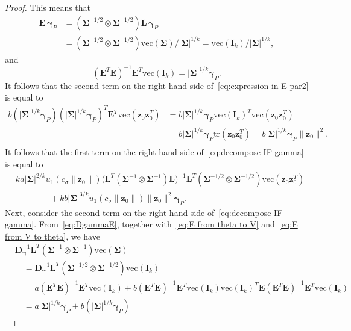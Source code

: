 \documentclass{article}
\numberwithin{equation}{section}
\theoremstyle{plain}
\newcommand{\vc}{\mathrm{vec}}
\newcommand{\bgamma}{\bm\gamma}
\newcommand{\bSigma}{\mathbf{\Sigma}}
\newcommand{\bz}{\mathbf{z}}
\newcommand{\bI}{\mathbf{I}}
\newcommand{\bD}{\mathbf{D}}
\newcommand{\bL}{\mathbf{L}}
\newcommand{\bE}{\mathbf{E}}
\begin{document}
\begin{proof}
This means that
\begin{equation}
\label{eq:E from theta to V}
\begin{split}
\bE\,\bgamma_P
&=
\left(\bSigma^{-1/2}\otimes\bSigma^{-1/2}\right)\bL\,
\bgamma_P\\
&=
\left(\bSigma^{-1/2}\otimes\bSigma^{-1/2}\right)
\vc(\bSigma)/|\bSigma|^{1/k}
=
\vc(\bI_k)/|\bSigma|^{1/k},
\end{split}
\end{equation}
and
\begin{equation}
\label{eq:E from V to theta}
(\bE^T\bE)^{-1}\bE^T\vc(\bI_k)=|\bSigma|^{1/k}\bgamma_P.
\end{equation} 
It follows that the second term on the right hand side of~\eqref{eq:expression in E par2} is equal to
\[
\begin{split}
b
\left(|\bSigma|^{1/k}\bgamma_P\right)
\left(|\bSigma|^{1/k}\bgamma_P\right)^T
\bE^T\vc\left(\bz_0\bz_0^T\right)
&=
b|\bSigma|^{1/k}
\bgamma_P
\vc(\bI_k)^T\vc\left(\bz_0\bz_0^T\right)\\
&=
b|\bSigma|^{1/k}
\bgamma_P
\text{tr}\left(\bz_0\bz_0^T\right)
=
b|\bSigma|^{1/k}
\bgamma_P
\|\bz_0\|^2.\\
\end{split}
\]
It follows that the first term on the right hand side of~\eqref{eq:decompose IF gamma} is equal to
\[
\begin{split}
&
ka
|\bSigma|^{2/k}
u_1\left(c_\sigma\|\bz_0\|\right)
\Big(\bL^T(\bSigma^{-1}\otimes\bSigma^{-1})\bL\Big)^{-1}
\bL^T\left(\bSigma^{-1/2}\otimes\bSigma^{-1/2}\right)
\vc\left(\bz_0\bz_0^T\right)\\
&\qquad\qquad+
kb
|\bSigma|^{3/k}
u_1\left(c_\sigma\|\bz_0\|\right)
\|\bz_0\|^2\bgamma_P.
\end{split}
\]
Next, consider the second term on the right hand side of~\eqref{eq:decompose IF gamma}.
From~\eqref{eq:DgammaE},
together with~\eqref{eq:E from theta to V} and~\eqref{eq:E from V to theta},
we have 
\[
\begin{split}
&
\bD_{\bgamma}^{-1}
\bL^T
(\bSigma^{-1}\otimes\bSigma^{-1})
\vc(\bSigma)\\
&\quad=
\bD_{\bgamma}^{-1}
\bL^T
(\bSigma^{-1/2}\otimes\bSigma^{-1/2})
\vc(\bI_k)\\
&\quad=
a(\bE^T\bE)^{-1}
\bE^T
\vc\left(\bI_k\right)
+
b
(\bE^T\bE)^{-1}
\bE^T\vc(\bI_k)
\vc(\bI_k)^T\bE
(\bE^T\bE)^{-1}
\bE^T
\vc\left(\bI_k\right)\\
&\quad=
a|\bSigma|^{1/k}\bgamma_P
+
b(|\bSigma|^{1/k}\bgamma_P)

\end{split}\]
\end{proof}
\end{document}
